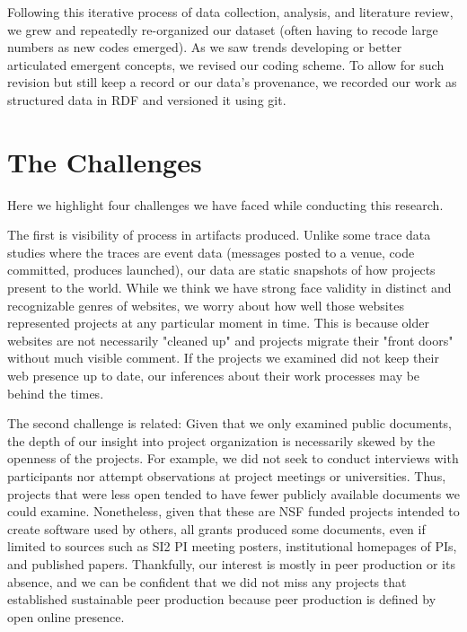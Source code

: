 \documentclass[sigchi-a,screen]{acmart}
\begin{document}
Following this iterative process of data collection, analysis, and literature review, we grew and repeatedly re-organized our dataset (often having to recode large numbers as new codes emerged). As we saw trends developing or better articulated emergent concepts, we revised our coding scheme. To allow for such revision but still keep a record or our data's provenance, we recorded our work as structured data in RDF and versioned it using git. 

\section{The Challenges}

Here we highlight four challenges we have faced while conducting this research.

The first is visibility of process in artifacts produced. Unlike some trace data studies where the traces are event data (messages posted to a venue, code committed, produces launched), our data are static snapshots of how projects present to the world. While we think we have strong face validity in distinct and recognizable genres of websites, we worry about how well those websites represented projects at any particular moment in time. This is because older websites are not necessarily "cleaned up" and projects migrate their "front doors" without much visible comment. If the projects we examined did not keep their web presence up to date, our inferences about their work processes may be behind the times. 

The second challenge is related: Given that we only examined public documents, the depth of our insight into project organization is necessarily skewed by the openness of the projects. For example, we did not seek to conduct interviews with participants nor attempt observations at project meetings or universities. Thus, projects that were less open tended to have fewer publicly available documents we could examine. Nonetheless, given that these are NSF funded projects intended to create software used by others, all grants produced some documents, even if limited to sources such as SI2 PI meeting posters, institutional homepages of PIs, and published papers. Thankfully, our interest is mostly in peer production or its absence, and we can be confident that we did not miss any projects that established sustainable peer production because peer production is defined by open online presence. 
\end{document}
